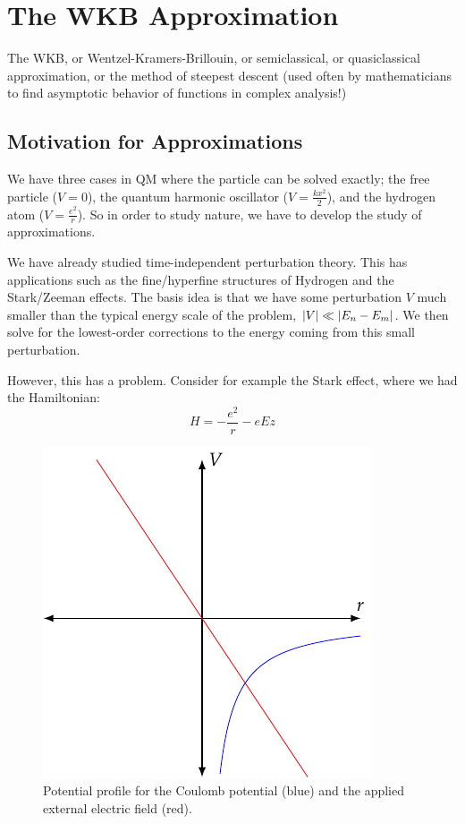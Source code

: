 \section{The WKB Approximation}
The WKB, or Wentzel-Kramers-Brillouin, or semiclassical, or quasiclassical approximation, or the method of steepest descent (used often by mathematicians to find asymptotic behavior of functions in complex analysis!)

\subsection{Motivation for Approximations}
We have three cases in QM where the particle can be solved exactly; the free particle ($V = 0$), the quantum harmonic oscillator ($V = \frac{kx^2}{2}$), and the hydrogen atom ($V = \frac{e^2}{r}$). So in order to study nature, we have to develop the study of approximations. 

We have already studied time-independent perturbation theory. This has applications such as the fine/hyperfine structures of Hydrogen and the Stark/Zeeman effects. The basis idea is that we have some perturbation $V$ much smaller than the typical energy scale of the problem, $\lvert V \rvert \ll \lvert E_n - E_m \rvert$. We then solve for the lowest-order corrections to the energy coming from this small perturbation.

However, this has a problem. Consider for example the Stark effect, where we had the Hamiltonian:
\begin{equation}
    H = -\frac{e^2}{r} - eEz
\end{equation}

\begin{figure}[htbp]
    \centering
    \includegraphics[]{Images/fig-potentialEfieldcoulomb.pdf}
    
    \caption{Potential profile for the Coulomb potential (blue) and the applied external electric field (red).}
    \label{fig-potentialEfieldcoulomb}
\end{figure}

